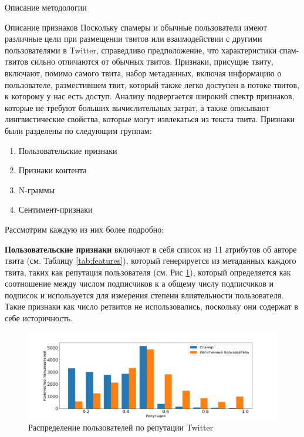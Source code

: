 \begin{section}{Описание методологии}
  \begin{subsection}{Описание признаков}
    Поскольку спамеры и обычные пользователи имеют различные цели при размещении твитов или взаимодействии с другими пользователями в Twitter, справедливо предположение, что характеристики спам-твитов сильно отличаются от обычных твитов.
    Признаки, присущие твиту, включают, помимо самого твита, набор метаданных, включая информацию о пользователе, разместившем твит, который также легко доступен в потоке твитов, к которому у нас есть доступ.
    Анализу подвергается широкий спектр признаков, которые не требуют больших вычислительных затрат, а также описывают лингвистические свойства, которые могут извлекаться из текста твита.
    Признаки были разделены по следующим группам:
    \begin{enumerate}
      \item Пользовательские признаки
      \item Признаки контента
      \item N-граммы
      \item Сентимент-признаки
    \end{enumerate}
    Рассмотрим каждую из них более подробно:

    \textbf{Пользовательские признаки} включают в себя список из 11 атрибутов об авторе твита (см. Таблицу \ref{tab:features}), который генерируется из метаданных каждого твита, таких как репутация пользователя \cite{Wang} (см. Рис \ref{pic:reputation}), который определяется как соотношение между числом подписчиков к а общему числу подписчиков и подписок и используется для измерения степени влиятельности пользователя. Такие признаки как число ретвитов не использовались, поскольку они содержат в себе историчность.

    \begin{figure}[ht!]
    \centering
    \includegraphics[width=1.0\textwidth]{pics/reputation}
    \caption{Распределение пользователей по репутации Twitter}
    \label{pic:reputation}
    \end{figure}


\end{subsection}
\end{section}
